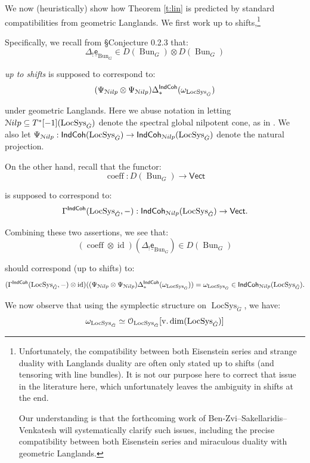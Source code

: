 \documentclass[reqno,11pt]{amsart}
\numberwithin{equation}{subsection}
\theoremstyle{remark}
\newcommand{\sN}{{\EuScript N}}
\newcommand{\sO}{{\EuScript O}}
\newcommand{\on}{\operatorname}
\newcommand{\ul}{\underline}
\newcommand{\id}{\on{id}}
\newcommand{\Vect}{\mathsf{Vect}}
\newcommand{\Bun}{\on{Bun}}
\newcommand{\LocSys}{\on{LocSys}}
\newcommand{\IndCoh}{\mathsf{IndCoh}}
\renewcommand{\subset}{\subseteq}
\newcommand{\coeff}{\on{coeff}}
\newcommand{\Nilp}{\sN ilp}
\newcommand{\sfe}{\mathsf{e}}
\begin{document}
We now (heuristically) show how Theorem \ref{t:lin} is predicted
by standard compatibilities from geometric Langlands.
We first work up to shifts,\footnote{Unfortunately, the compatibility between
both Eisenstein series and strange duality with Langlands duality 
are often only stated up to shifts (and tensoring with line bundles). 
It is not our purpose here to correct 
that issue in the literature here, which unfortunately leaves the ambiguity in 
shifts at the end. 

Our understanding is that the forthcoming
work of Ben-Zvi--Sakellaridis--Venkatesh will systematically clarify such 
issues, including the precise compatibility between both Eisenstein series 
and miraculous duality with geometric Langlands.}

Specifically, we recall from \cite{strange} \S Conjecture 0.2.3 that:
%
\[
\Delta_!\ul{\sfe}_{\Bun_G} \in D(\Bun_G) \otimes D(\Bun_G)
\]

\noindent \emph{up to shifts} is supposed to correspond to:
%
\[
(\Psi_{\Nilp} \otimes \Psi_{\Nilp})\Delta_*^{\IndCoh}(\omega_{\LocSys_{\check{G}}})
\]

\noindent under geometric Langlands. Here we abuse notation in letting
$\Nilp \subset T^*[-1](\LocSys_{\check{G}})$ denote the spectral
global nilpotent cone, as in \cite{arinkin-gaitsgory}. 
We also let $\Psi_{\Nilp}:\IndCoh(\LocSys_{\check{G}}) \to 
\IndCoh_{\Nilp}(\LocSys_{\check{G}})$ denote the natural projection. 

On the other hand, recall that the functor: 
%
\[
\coeff:D(\Bun_G) \to \Vect
\]

\noindent is supposed to correspond to: 
%
\[
\Gamma^{\IndCoh}(\LocSys_{\check{G}},-):
\IndCoh_{\Nilp}(\LocSys_{\check{G}}) \to \Vect.
\]

Combining these two assertions, we see that:
%
\begin{equation}\label{eq:coeff-id-gl}
(\coeff \otimes\id)(\Delta_!\ul{\sfe}_{\Bun_G}) \in D(\Bun_G)
\end{equation}

\noindent should correspond (up to shifts) to:
%
\[
(\Gamma^{\IndCoh}(\LocSys_{\check{G}},-) \otimes \id)
((\Psi_{\Nilp} \otimes \Psi_{\Nilp})\Delta_*^{\IndCoh}(\omega_{\LocSys_{\check{G}}}))
= \omega_{\LocSys_{\check{G}}} \in \IndCoh_{\Nilp}(\LocSys_{\check{G}}).
\]

We now observe that using the symplectic structure on $\LocSys_{\check{G}}$,
we have: 
%
\[
\omega_{\LocSys_{\check{G}}} \simeq 
\sO_{\LocSys_{\check{G}}}[\on{v.dim}(\LocSys_{\check{G}})]
\]
\end{document}
